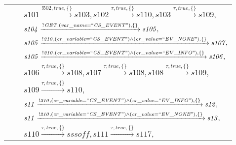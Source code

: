 \begin{tabular}{lcp{350px}}
& & $\mathit{s101}\xrightarrow{\mathit{!502}, \mathit{true}, \{\}}\mathit{s103},\mathit{s102}\xrightarrow{\mathit{\tau}, \mathit{true}, \{\}}\mathit{s110},\mathit{s103}\xrightarrow{\mathit{\tau}, \mathit{true}, \{\}}\mathit{s109},$ \\
& & $\mathit{s104}\xrightarrow{\mathit{?GET}, \mathit{(var\_name = ``CS\_EVENT")}, \{\}}\mathit{s105},$ \\
& & $\mathit{s105}\xrightarrow{\mathit{!210}, \mathit{(cr\_variable = ``CS\_EVENT") \land (cr\_value = ``EV\_NONE")}, \{\}}\mathit{s107},$ \\
& & $\mathit{s105}\xrightarrow{\mathit{!210}, \mathit{(cr\_variable = ``CS\_EVENT") \land (cr\_value = ``EV\_INFO")}, \{\}}\mathit{s106},$ \\
& & $\mathit{s106}\xrightarrow{\mathit{\tau}, \mathit{true}, \{\}}\mathit{s108},\mathit{s107}\xrightarrow{\mathit{\tau}, \mathit{true}, \{\}}\mathit{s108},\mathit{s108}\xrightarrow{\mathit{\tau}, \mathit{true}, \{\}}\mathit{s109},$ \\
& & $\mathit{s109}\xrightarrow{\mathit{\tau}, \mathit{true}, \{\}}\mathit{s110},$ \\
& & $\mathit{s11}\xrightarrow{\mathit{!210}, \mathit{(cr\_variable = ``CS\_EVENT") \land (cr\_value = ``EV\_INFO")}, \{\}}\mathit{s12},$ \\
& & $\mathit{s11}\xrightarrow{\mathit{!210}, \mathit{(cr\_variable = ``CS\_EVENT") \land (cr\_value = ``EV\_NONE")}, \{\}}\mathit{s13},$ \\
& & $\mathit{s110}\xrightarrow{\mathit{\tau}, \mathit{true}, \{\}}\mathit{sssoff},\mathit{s111}\xrightarrow{\mathit{\tau}, \mathit{true}, \{\}}\mathit{s117},$ \\
\end{tabular}

